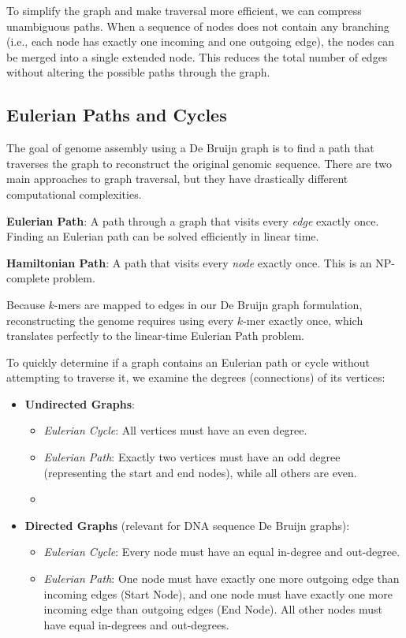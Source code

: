 \documentclass{article}
\begin{document}
To simplify the graph and make traversal more efficient, we can compress unambiguous paths. When a sequence of nodes does not contain any branching (i.e., each node has exactly one incoming and one outgoing edge), the nodes can be merged into a single extended node. This reduces the total number of edges without altering the possible paths through the graph.

\subsection{Eulerian Paths and Cycles}

The goal of genome assembly using a De Bruijn graph is to find a path that traverses the graph to reconstruct the original genomic sequence. There are two main approaches to graph traversal, but they have drastically different computational complexities.

\begin{important}
    \textbf{Eulerian Path}: A path through a graph that visits every \textit{edge} exactly once. Finding an Eulerian path can be solved efficiently in linear time.
\end{important}

\begin{important}
    \textbf{Hamiltonian Path}: A path that visits every \textit{node} exactly once. This is an NP-complete problem.
\end{important}

Because $k$-mers are mapped to edges in our De Bruijn graph formulation, reconstructing the genome requires using every $k$-mer exactly once, which translates perfectly to the linear-time Eulerian Path problem.

To quickly determine if a graph contains an Eulerian path or cycle without attempting to traverse it, we examine the degrees (connections) of its vertices:
\begin{itemize}
    \item \textbf{Undirected Graphs}: 
    \begin{itemize}
        \item \textit{Eulerian Cycle}: All vertices must have an even degree.
        \item \textit{Eulerian Path}: Exactly two vertices must have an odd degree (representing the start and end nodes), while all others are even.
    \item \end{itemize}
    \item \textbf{Directed Graphs} (relevant for DNA sequence De Bruijn graphs):
    \begin{itemize}
        \item \textit{Eulerian Cycle}: Every node must have an equal in-degree and out-degree.
        \item \textit{Eulerian Path}: One node must have exactly one more outgoing edge than incoming edges (Start Node), and one node must have exactly one more incoming edge than outgoing edges (End Node). All other nodes must have equal in-degrees and out-degrees.
    \end{itemize}
\end{itemize}
\end{document}
